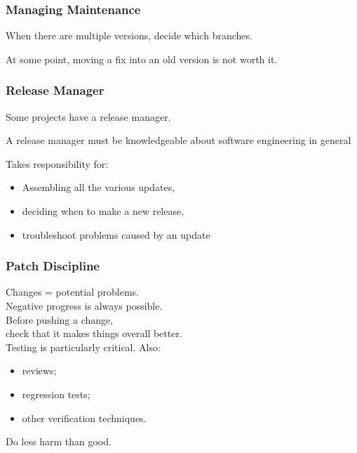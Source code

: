 \begin{frame}
\frametitle{Managing Maintenance}
\begin{changemargin}{1cm}
When there are multiple versions, decide which branches.

At some point, moving a fix into an old version is not worth it.

\end{changemargin}
\end{frame}

\begin{frame}
\frametitle{Release Manager}
\begin{changemargin}{1cm}
Some projects have a release manager.

A release manager must be knowledgeable about software engineering in general

Takes responsibility for: 
\begin{itemize}
\item Assembling all the various updates, 
\item deciding when to make a new release, 
\item troubleshoot problems caused by an update
\end{itemize}

\end{changemargin}
\end{frame}

\begin{frame}
\frametitle{Patch Discipline}
\begin{changemargin}{1cm}

Changes = potential problems.\\
Negative progress is always possible.\\[1em]

Before pushing a change,\\
check that it makes things overall better.\\[1em]

Testing is particularly critical. Also:
\begin{itemize}
\item reviews;
\item regression tests;
\item other verification techniques.
\end{itemize}
Do less harm than good.

\end{changemargin}
\end{frame}

